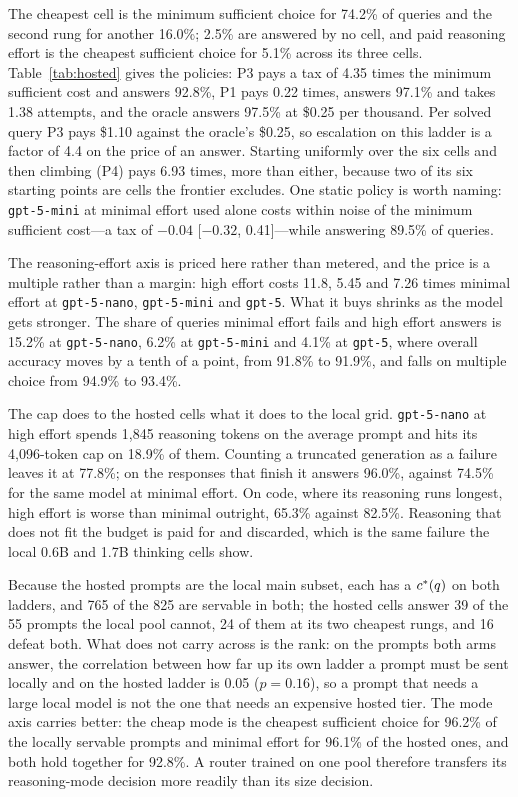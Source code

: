 The cheapest cell is the minimum sufficient choice for 74.2\% of queries and
the second rung for another 16.0\%; 2.5\% are answered by no cell, and paid
reasoning effort is the cheapest sufficient choice for 5.1\% across its three
cells. Table~\ref{tab:hosted} gives the policies: P3 pays a tax of 4.35 times
the minimum sufficient cost and answers 92.8\%, P1 pays 0.22 times, answers
97.1\% and takes 1.38 attempts, and the oracle answers 97.5\% at \$0.25 per
thousand. Per solved query P3 pays \$1.10 against the oracle's \$0.25, so
escalation on this ladder is a factor of 4.4 on the price of an answer.
Starting uniformly over the six cells and then climbing (P4) pays 6.93 times,
more than either, because two of its six starting points are cells the
frontier excludes. One static policy is worth naming: \texttt{gpt-5-mini} at
minimal effort used alone costs within noise of the minimum sufficient
cost---a tax of $-0.04$ [$-0.32$, 0.41]---while answering 89.5\% of queries.

The reasoning-effort axis is priced here rather than metered, and the price
is a multiple rather than a margin: high effort costs 11.8, 5.45 and 7.26
times minimal effort at \texttt{gpt-5-nano}, \texttt{gpt-5-mini} and
\texttt{gpt-5}. What it buys shrinks as the model gets stronger. The share of
queries minimal effort fails and high effort answers is 15.2\% at
\texttt{gpt-5-nano}, 6.2\% at \texttt{gpt-5-mini} and 4.1\% at
\texttt{gpt-5}, where overall accuracy moves by a tenth of a point, from
91.8\% to 91.9\%, and falls on multiple choice from 94.9\% to 93.4\%.

The cap does to the hosted cells what it does to the local grid.
\texttt{gpt-5-nano} at high effort spends 1{,}845 reasoning tokens on the
average prompt and hits its 4{,}096-token cap on 18.9\% of them. Counting a
truncated generation as a failure leaves it at 77.8\%; on the responses that
finish it answers 96.0\%, against 74.5\% for the same model at minimal
effort. On code, where its reasoning runs longest, high effort is worse than
minimal outright, 65.3\% against 82.5\%. Reasoning that does not fit the
budget is paid for and discarded, which is the same failure the local 0.6B
and 1.7B thinking cells show.

Because the hosted prompts are the local main subset, each has a $c^{*}(q)$
on both ladders, and 765 of the 825 are servable in both; the hosted cells
answer 39 of the 55 prompts the local pool cannot, 24 of them at its two
cheapest rungs, and 16 defeat both. What does not carry across is the rank:
on the prompts both arms answer, the correlation between how far up its own
ladder a prompt must be sent locally and on the hosted ladder is 0.05
($p = 0.16$), so a prompt that needs a large local model is not the one that
needs an expensive hosted tier. The mode axis carries better: the cheap mode
is the cheapest sufficient choice for 96.2\% of the locally servable prompts
and minimal effort for 96.1\% of the hosted ones, and both hold together for
92.8\%. A router trained on one pool therefore transfers its reasoning-mode
decision more readily than its size decision.


